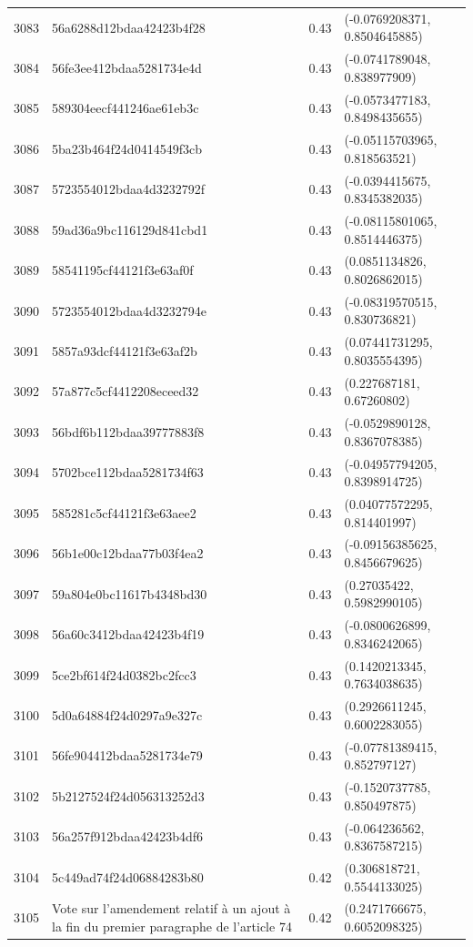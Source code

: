 \begin{table}[ht]
\begin{tabular}{rlrl}
  3083 & 56a6288d12bdaa42423b4f28 & 0.43 & (-0.0769208371, 0.8504645885) \\ 
  3084 & 56fe3ee412bdaa5281734e4d & 0.43 & (-0.0741789048, 0.838977909) \\ 
  3085 & 589304eecf441246ae61eb3c & 0.43 & (-0.0573477183, 0.8498435655) \\ 
  3086 & 5ba23b464f24d0414549f3cb & 0.43 & (-0.05115703965, 0.818563521) \\ 
  3087 & 5723554012bdaa4d3232792f & 0.43 & (-0.0394415675, 0.8345382035) \\ 
  3088 & 59ad36a9bc116129d841cbd1 & 0.43 & (-0.08115801065, 0.8514446375) \\ 
  3089 & 58541195cf44121f3e63af0f & 0.43 & (0.0851134826, 0.8026862015) \\ 
  3090 & 5723554012bdaa4d3232794e & 0.43 & (-0.08319570515, 0.830736821) \\ 
  3091 & 5857a93dcf44121f3e63af2b & 0.43 & (0.07441731295, 0.8035554395) \\ 
  3092 & 57a877c5cf4412208eceed32 & 0.43 & (0.227687181, 0.67260802) \\ 
  3093 & 56bdf6b112bdaa39777883f8 & 0.43 & (-0.0529890128, 0.8367078385) \\ 
  3094 & 5702bce112bdaa5281734f63 & 0.43 & (-0.04957794205, 0.8398914725) \\ 
  3095 & 585281c5cf44121f3e63aee2 & 0.43 & (0.04077572295, 0.814401997) \\ 
  3096 & 56b1e00c12bdaa77b03f4ea2 & 0.43 & (-0.09156385625, 0.8456679625) \\ 
  3097 & 59a804e0bc11617b4348bd30 & 0.43 & (0.27035422, 0.5982990105) \\ 
  3098 & 56a60c3412bdaa42423b4f19 & 0.43 & (-0.0800626899, 0.8346242065) \\ 
  3099 & 5ce2bf614f24d0382bc2fcc3 & 0.43 & (0.1420213345, 0.7634038635) \\ 
  3100 & 5d0a64884f24d0297a9e327c & 0.43 & (0.2926611245, 0.6002283055) \\ 
  3101 & 56fe904412bdaa5281734e79 & 0.43 & (-0.07781389415, 0.852797127) \\ 
  3102 & 5b2127524f24d056313252d3 & 0.43 & (-0.1520737785, 0.850497875) \\ 
  3103 & 56a257f912bdaa42423b4df6 & 0.43 & (-0.064236562, 0.8367587215) \\ 
  3104 & 5c449ad74f24d06884283b80 & 0.42 & (0.306818721, 0.5544133025) \\ 
  3105 & Vote sur l'amendement relatif à un ajout à la fin du premier paragraphe de l'article 74 & 0.42 & (0.2471766675, 0.6052098325) \\ 

\end{tabular}
\end{table}
